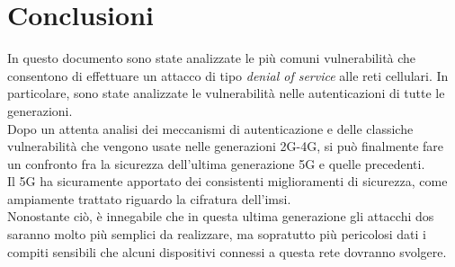 \chapter{Conclusioni}
In questo documento sono state analizzate le più comuni vulnerabilità che consentono di effettuare un 
attacco di tipo \textit{denial of service} alle reti cellulari. In particolare, sono state analizzate le vulnerabilità nelle autenticazioni 
di tutte le generazioni.\\
Dopo un attenta analisi dei meccanismi di autenticazione e delle classiche vulnerabilità che vengono usate nelle generazioni 2G-4G, si può finalmente
fare un confronto fra la sicurezza dell'ultima generazione 5G e quelle precedenti.\\
Il 5G ha sicuramente apportato dei consistenti miglioramenti di sicurezza, come ampiamente trattato riguardo la cifratura dell'\gls{imsi}.\\
Nonostante ciò, è innegabile che in questa ultima generazione gli attacchi \gls{dos} saranno molto più semplici da realizzare, ma sopratutto più pericolosi dati
i compiti sensibili che alcuni dispositivi connessi a questa rete dovranno svolgere.